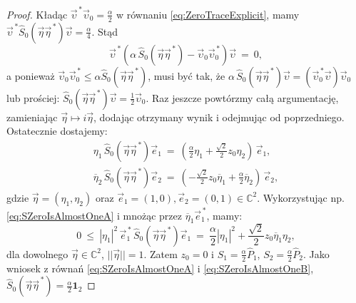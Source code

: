 \begin{proof}
Kładąc $\vec{\upsilon}^{\,*} \vec{\upsilon}_{0} = \frac{\alpha}{2}$
w równaniu \eqref{eq:ZeroTraceExplicit}, mamy
$
\vec{\upsilon}^{\,*} \hat{S}_{0}(\vec{\eta} \vec{\eta}^{\,*}) \vec{\upsilon} =
\frac{\alpha}{4}
$.
Stąd
\begin{equation}
 \vec{\upsilon}^{\,*} \left(
    \alpha \, \hat{S}_{0}(\vec{\eta} \vec{\eta}^{\,*}) -\vec{\upsilon}_{0} \vec{\upsilon}_{0}^{\,*}
  \right) \vec{\upsilon} \: = \: 0,
\end{equation}
a ponieważ
$\vec{\upsilon}_{0} \vec{\upsilon}_{0}^{\,*} \leq  \alpha \hat{S}_{0}(\vec{\eta} \vec{\eta}^{\,*})$,
musi być tak, że
$ \alpha \, \hat{S}_{0}(\vec{\eta} \vec{\eta}^{\,*}) \vec{\upsilon} =
\left( \vec{\upsilon}_{0}^{\,*} \vec{\upsilon} \right)  \vec{\upsilon}_{0}$
lub prościej:
$ \hat{S}_{0}(\vec{\eta} \vec{\eta}^{\,*}) \vec{\upsilon} = \frac{1}{2} \vec{\upsilon}_{0}$.
Raz jeszcze powtórzmy całą argumentację, zamieniając
$\vec{\eta} \mapsto i \vec{\eta}$,
dodając otrzymany wynik i odejmując od poprzedniego.
Ostatecznie dostajemy:
\begin{subequations}
    \begin{align}
\label{eq:SZeroIsAlmostOneA}
\eta_{1} \, \hat{S}_{0}(\vec{\eta} \vec{\eta}^{\,*}) \vec{e}_{1} \: = \:
   \left( \frac{\alpha}{2} \eta_{1} + \frac{\sqrt{2}}{2} z_{0} \eta_{2} \right) \, \vec{e}_{1}, \\
\label{eq:SZeroIsAlmostOneB}
\overline{\eta}_{2} \, \hat{S}_{0}(\vec{\eta} \vec{\eta}^{\,*}) \vec{e}_{2} \: = \:
   \left(- \frac{\sqrt{2}}{2} z_{0} \overline{\eta}_{1} + \frac{\alpha}{2} \overline{\eta}_{2} \right)
       \, \vec{e}_{2},
    \end{align}
\end{subequations}
gdzie $\vec{\eta} = (\eta_{1}, \eta_{2})$ oraz
$\vec{e}_{1} = (1,0), \vec{e}_{2} = (0,1) \in \mathbb{C}^{2}$.
Wykorzystując np. \eqref{eq:SZeroIsAlmostOneA}
i mnożąc przez  $\overline{\eta}_{1} \vec{e}_{1}^{\,*}$,
mamy:
\begin{equation}
0 \: \leq \:
 |\eta_{1}|^{2} \, \vec{e}_{1}^{\,*} \, \hat{S}_{0}(\vec{\eta} \vec{\eta}^{\,*}) \vec{e}_{1}
 \: = \:
\frac{\alpha}{2} |\eta_{1}|^{2} + \frac{\sqrt{2}}{2} z_{0} \overline{\eta}_{1} \eta_{2},
\end{equation}
dla dowolnego $\vec{\eta} \in \mathbb{C}^{2}$, $||\vec{\eta}|| =1$.
Zatem $z_{0} = 0$ i
$S_{1} = \frac{\alpha}{2} \hat{P}_{1}$,
$S_{2} = \frac{\alpha}{2} \hat{P}_{2}$.
Jako wniosek z równań
\eqref{eq:SZeroIsAlmostOneA} i \eqref{eq:SZeroIsAlmostOneB},
$\hat{S}_{0} (\vec{\eta} \vec{\eta}^{\,*}) = \frac{\alpha}{2} \mathbf{1}_{2}$

\end{proof}
